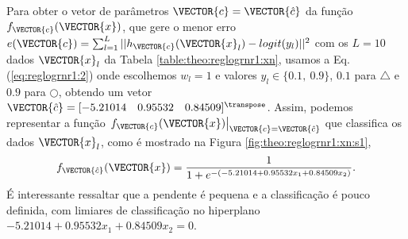 \begin{SolutionT}\label{sol:theo:reglogrnr1:s1}
Para obter o vetor de parâmetros $\VECTOR{c}=\VECTOR{\hat{c}}$ da função $f_{\VECTOR{c}}(\VECTOR{x})$, 
que gere o menor erro $e(\VECTOR{c}) =  \sum_{l=1}^{L} ||h_{\VECTOR{c}}(\VECTOR{x}_l)-logit(y_l)||^2$
com os $L=10$ dados $\VECTOR{x}_l$ da Tabela \ref{table:theo:reglogrnr1:xn},
usamos a Eq. (\ref{eq:reglogrnr1:2}) onde escolhemos $w_l=1$ e valores $y_l \in \{0.1,~ 0.9\}$,
$0.1$ para $\bigtriangleup$ e $0.9$ para $\bigcirc$,
obtendo um vetor $\VECTOR{\hat{c}}=[-5.21014\quad 0.95532\quad 0.84509]^{\transpose}$.
Assim, podemos representar a função $\left.f_{\VECTOR{c}}(\VECTOR{x})\right|_{\VECTOR{c}=\VECTOR{\hat{c}}}$
 que classifica os dados $\VECTOR{x}_l$, 
como é mostrado na Figura \ref{fig:theo:reglogrnr1:xn:s1},
\begin{equation}
f_{\VECTOR{\hat{c}}}(\VECTOR{x})= \frac{1}{1+e^{-(-5.21014  +0.95532 x_1+ 0.84509 x_2)}}.
\end{equation}
É interessante ressaltar que a pendente é pequena e a classificação é pouco definida,
com limiares de classificação no hiperplano $-5.21014  +0.95532 x_1+ 0.84509 x_2=0$.
\end{SolutionT}

